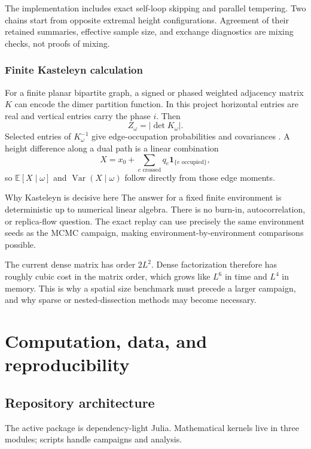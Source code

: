\documentclass[11pt,a4paper,oneside,openany]{memoir}
\newcommand{\E}{\mathbb{E}}
\newcommand{\Var}{\operatorname{Var}}
\newcommand{\1}{\bm{1}}
\begin{document}
The implementation includes exact self-loop skipping and parallel tempering.
Two chains start from opposite extremal height configurations. Agreement of
their retained summaries, effective sample size, and exchange diagnostics are
mixing checks, not proofs of mixing.

\subsection{Finite Kasteleyn calculation}

For a finite planar bipartite graph, a signed or phased weighted adjacency
matrix $K$ can encode the dimer partition function. In this project horizontal
entries are real and vertical entries carry the phase $i$. Then
\[
  Z_\omega=|\det K_\omega|.
\]
Selected entries of $K_\omega^{-1}$ give edge-occupation probabilities and
covariances \cite{Kasteleyn1961,Kenyon2009}. A height difference along a dual
path is a linear combination
\[
  X=x_0+\sum_{e\text{ crossed}}q_e\1_{\{e\text{ occupied}\}},
\]
so $\E[X\mid\omega]$ and $\Var(X\mid\omega)$ follow directly from those edge
moments.

\begin{bigidea}{Why Kasteleyn is decisive here}
The answer for a fixed finite environment is deterministic up to numerical
linear algebra. There is no burn-in, autocorrelation, or replica-flow question.
The exact replay can use precisely the same environment seeds as the MCMC
campaign, making environment-by-environment comparisons possible.
\end{bigidea}

The current dense matrix has order $2L^2$. Dense factorization therefore has
roughly cubic cost in the matrix order, which grows like $L^6$ in time and
$L^4$ in memory. This is why a spatial size benchmark must precede a larger
campaign, and why sparse or nested-dissection methods may become necessary.

\chapter{Computation, data, and reproducibility}
\label{chap:computation}

\section{Repository architecture}

The active package is dependency-light Julia. Mathematical kernels live in
three modules; scripts handle campaigns and analysis.
\end{document}
